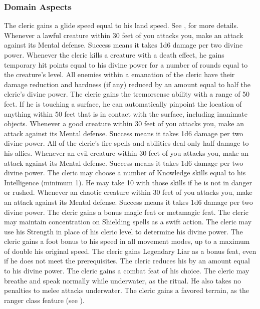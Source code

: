 \subsubsection{Domain Aspects}\label{Domain Aspects}

The cleric gains a glide speed equal to his land speed.
See , for more details.
Whenever a lawful creature within 30 feet of you attacks you, make an attack against its Mental defense.
Success means it takes 1d6 damage per two divine power.
Whenever the cleric kills a creature with a death effect, he gains temporary hit points equal to his divine power for a number of rounds equal to the creature's level.
All enemies within a \areamed emanation of the cleric have their damage reduction and hardness (if any) reduced by an amount equal to half the cleric's divine power.
The cleric gains the tremorsense ability with a range of 50 feet.
If he is touching a surface, he can automatically pinpoint the location of anything within 50 feet that is in contact with the surface, including inanimate objects.
Whenever a good creature within 30 feet of you attacks you, make an attack against its Mental defense.
Success means it takes 1d6 damage per two divine power.
All of the cleric's fire spells and abilities deal only half damage to his allies.
Whenever an evil creature within 30 feet of you attacks you, make an attack against its Mental defense.
Success means it takes 1d6 damage per two divine power.
The cleric may choose a number of Knowledge skills equal to his Intelligence (minimum 1).
He may take 10 with those skills if he is not in danger or rushed.
Whenever an chaotic creature within 30 feet of you attacks you, make an attack against its Mental defense.
Success means it takes 1d6 damage per two divine power.
The cleric gains a bonus magic feat or metamagic feat.
The cleric may maintain concentration on Shielding spells as a swift action.
The cleric may use his Strength in place of his cleric level to determine his divine power.
The cleric gains a  foot bonus to his speed in all movement modes, up to a maximum of double his original speed.
The cleric gains Legendary Liar as a bonus feat, even if he does not meet the prerequisites.
The cleric reduces his  by an amount equal to his divine power.
The cleric gains a combat feat of his choice.
 The cleric may breathe and speak normally while underwater, as the 
ritual.
He also takes no penalties to melee attacks underwater.
The cleric gains a favored terrain, as the ranger class feature (see ).

